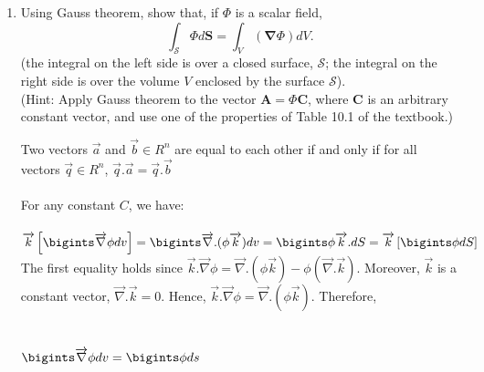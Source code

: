 \documentclass[fleqn]{article}
\begin{document}
\begin{enumerate}
    \item Using Gauss theorem, show that, if $\Phi$ is a scalar field,
    $$        
    \int_{\mathcal S}\Phi d{\mathbf S}=\int_{V} (\mathbf{\nabla} \Phi) dV .
    $$
    (the integral on the left side is over a closed surface, $\mathcal S$; the integral on the right side is over the volume $V$ enclosed by the surface  $\mathcal S$). \\
    (Hint: Apply Gauss theorem to the vector $\mathbf{A} = \Phi\mathbf{C}$, where $\mathbf{C}$ is an arbitrary constant vector, and use one of the properties of Table 10.1 of the textbook.)

      \textcolor{hwColor}{
        Two vectors $\overrightarrow{a}$ and $\overrightarrow{b} \in R^n$ are equal to each other if and only if for all vectors $\overrightarrow{q} \in R^n$, 
        $\overrightarrow{q}.\overrightarrow{a}=\overrightarrow{q}.\overrightarrow{b}$ \\ \\ 
        For any constant $C$, we have: \\ \\
        $
          \overrightarrow{k}\left[\bigints \overrightarrow{\nabla}\phi dv \right]=\bigints \overrightarrow{\nabla}.(\phi \overrightarrow{k})dv=\bigints \phi \overrightarrow{k}.dS=\overrightarrow{k}\left[\bigints \phi dS\right] \\ \\
        $
        The first equality holds since $\overrightarrow{k}.\overrightarrow{\nabla}\phi=\overrightarrow{\nabla}.(\phi \overrightarrow{k})-\phi(\overrightarrow{\nabla}.\overrightarrow{k})$. Moreover, $\overrightarrow{k}$
        is a constant vector, $\overrightarrow{\nabla}.\overrightarrow{k}=0$. Hence, $\overrightarrow{k}.\overrightarrow{\nabla}\phi=\overrightarrow{\nabla}.(\phi \overrightarrow{k})$. Therefore, \\ \\ \\
        $
          \bigints \overrightarrow{\nabla}\phi dv=\bigints \phi ds
        $
      }
      
  \end{enumerate}
\end{document}
